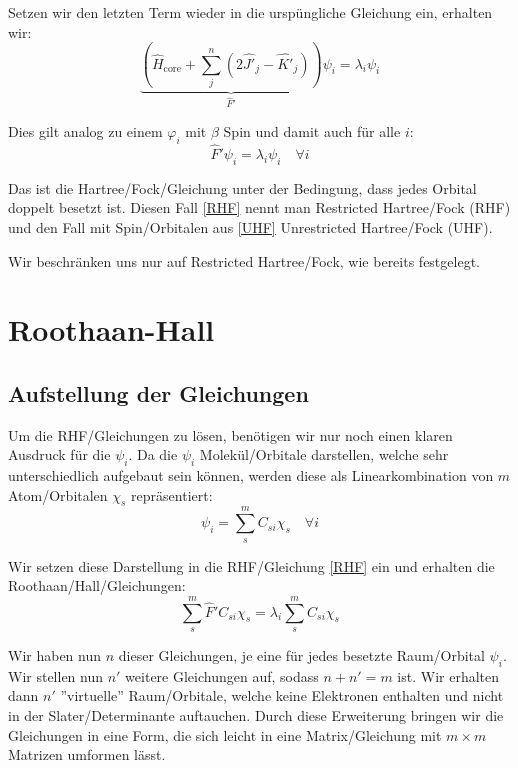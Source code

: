 Setzen wir den letzten Term wieder in die urspüngliche Gleichung ein, erhalten wir:
\begin{equation}
  \underbrace{\left( \hat{H}_{\text{core}} + \sum_j^{n}
  \left( 2\hat{J'}_j - \hat{K'}_j \right) \right)}_{\hat{F}'} \psi_i 
  = \lambda_i \psi_i
\end{equation}

Dies gilt analog zu einem $\varphi_i$ mit $\beta$ Spin und damit auch für alle $i$:
\begin{equation}\label{RHF}
  \hat{F}' \psi_i = \lambda_i \psi_i\quad \forall i
\end{equation}

Das ist die Hartree\-/Fock\-/Gleichung unter der Bedingung, dass jedes Orbital doppelt besetzt ist.
Diesen Fall \cref{RHF} nennt man Restricted Hartree\-/Fock (RHF) und
den Fall mit Spin\-/Orbitalen aus \cref{UHF} Unrestricted Hartree\-/Fock (UHF).

Wir beschränken uns nur auf Restricted Hartree\-/Fock, wie bereits festgelegt.

\section{Roothaan-Hall}
\subsection{Aufstellung der Gleichungen}
Um die RHF\-/Gleichungen zu lösen, benötigen wir nur noch einen klaren Ausdruck für die $\psi_i$.
Da die $\psi_i$ Molekül\-/Orbitale darstellen, welche sehr unterschiedlich aufgebaut sein können,
werden diese als Linearkombination von $m$ Atom\-/Orbitalen $\chi_s$ repräsentiert:
\begin{equation}\label{lin-comb-atomorbitals}
  \psi_i = \sum_s^m C_{s i} \chi_s \quad \forall i 
\end{equation}

Wir setzen diese Darstellung in die RHF\-/Gleichung \cref{RHF} ein und
erhalten die Roothaan\-/Hall\-/Gleichungen:
\begin{equation}\label{roothaan_hall_eq}
  \sum_s^m \hat{F}' C_{s i} \chi_s = \lambda_i \sum_s^m C_{s i} \chi_s 
\end{equation}

Wir haben nun $n$ dieser Gleichungen, je eine für jedes besetzte Raum\-/Orbital $\psi_i$.
Wir stellen nun $n'$ weitere Gleichungen auf, sodass $n + n' = m$ ist.
Wir erhalten dann $n'$ ''virtuelle'' Raum\-/Orbitale, welche keine Elektronen enthalten und
nicht in der Slater\-/Determinante auftauchen.
Durch diese Erweiterung bringen wir die Gleichungen in eine Form,
die sich leicht in eine Matrix\-/Gleichung mit $m\times m$ Matrizen umformen lässt.

